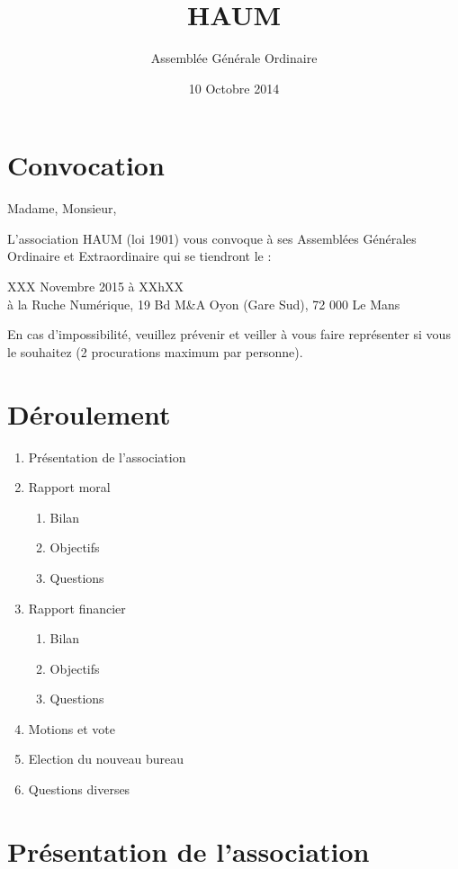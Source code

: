 \documentclass[11pt]{article}
\title{HAUM}
\author{Assemblée Générale Ordinaire}
\date{10 Octobre 2014}
\begin{document}
\maketitle


\section*{Convocation}

Madame, Monsieur, 

L'association HAUM (loi 1901) vous convoque à ses Assemblées Générales Ordinaire et Extraordinaire qui se tiendront le :

\begin{center}
{\Large XXX Novembre 2015 à XXhXX}\\
à la Ruche Numérique, 19 Bd M\&A Oyon (Gare Sud), 72 000 Le Mans
\end{center}

En cas d'impossibilité, veuillez prévenir et veiller à vous faire représenter si vous le souhaitez (2 procurations maximum par personne).

\section*{Déroulement}

\begin{enumerate}
    \item Présentation de l'association
    \item Rapport moral
        \begin{enumerate}
            \item Bilan
            \item Objectifs
            \item Questions
        \end{enumerate}
    \item Rapport financier
        \begin{enumerate}
            \item Bilan
            \item Objectifs
            \item Questions
        \end{enumerate}
    \item Motions et vote
    \item Election du nouveau bureau
    \item Questions diverses
\end{enumerate}

\section{Présentation de l'association}
\end{document}
